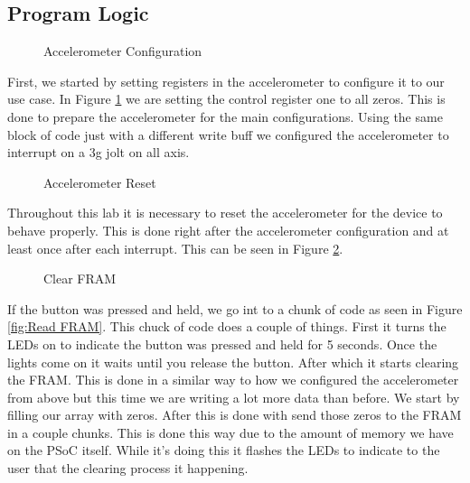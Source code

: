 \documentclass{article}
\begin{document}
  \subsection*{Program Logic}

    \begin{figure}[H]
      
      \caption{Accelerometer Configuration} 
      \label{fig:Accelerometer Configuration} 
    \end{figure}

    First, we started by setting registers in the accelerometer to configure it to our use case. In Figure \ref{fig:Accelerometer Configuration} we are setting the control register one to all zeros. This is done to prepare the accelerometer for the main configurations. Using the same block of code just with a different write buff we configured the accelerometer to interrupt on a 3g jolt on all axis.

    \begin{figure}[H]
      
      \caption{Accelerometer Reset} 
      \label{fig:Accelerometer Reset} 
    \end{figure}

    Throughout this lab it is necessary to reset the accelerometer for the device to behave properly. This is done right after the accelerometer configuration and at least once after each interrupt. This can be seen in Figure \ref{fig:Accelerometer Reset}.

    \begin{figure}[H]
      
      \caption{Clear FRAM} 
      \label{fig:Clear FRAM} 
    \end{figure}

    If the button was pressed and held, we go int to a chunk of code as seen in Figure \ref{fig:Read FRAM}. This chuck of code does a couple of things. First it turns the LEDs on to indicate the button was pressed and held for 5 seconds. Once the lights come on it waits until you release the button. After which it starts clearing the FRAM. This is done in a similar way to how we configured the accelerometer from above but this time we are writing a lot more data than before. We start by filling our array with zeros. After this is done with send those zeros to the FRAM in a couple chunks. This is done this way due to the amount of memory we have on the PSoC itself. While it’s doing this it flashes the LEDs to indicate to the user that the clearing process it happening. 
\end{document}
